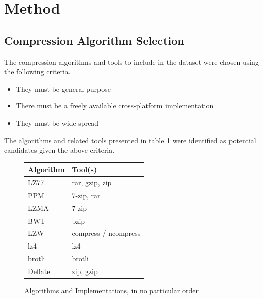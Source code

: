 \documentclass[conference]{IEEEtran}
\begin{document}
\section{Method}

\subsection{Compression Algorithm Selection}

The compression algorithms and tools to include in the dataset were chosen using the following criteria.

\begin{itemize}
    \item They must be general-purpose
    \item There must be a freely available cross-platform implementation
    \item They must be wide-spread
\end{itemize}

The algorithms and related tools presented in table \ref{fig:method:algorithms} were identified as potential candidates given the above criteria.

\begin{figure}[H]
    \centering
    \begin{tabular}{l|l}
        Algorithm & Tool(s)\\
        \hline
        LZ77 & rar, gzip, zip\cite{HORNEY2013,KONECKI2011} \\
        PPM & 7-zip, rar\cite{HORNEY2013, KONECKI2011} \\
        LZMA & 7-zip\cite{HORNEY2013, KONECKI2011} \\
        BWT & bzip\cite{HORNEY2013, KONECKI2011} \\
        LZW & compress / ncompress\cite{HORNEY2013, KONECKI2011} \\
        lz4 & lz4\footnotemark\\
        brotli & brotli\footnotemark \\
        Deflate & zip, gzip\cite{HORNEY2013} \\
    \end{tabular}
    \caption{Algorithms and Implementations, in no particular order}
    \label{fig:method:algorithms}
\end{figure}
\addtocounter{footnote}{-2}
\addtocounter{footnote}{1}
\addtocounter{footnote}{1}
\end{document}
